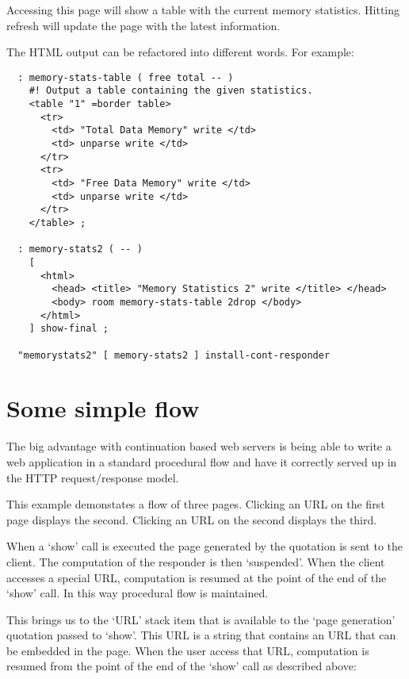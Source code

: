 Accessing this page will show a table with the current memory
statistics. Hitting refresh will update the page with the latest
information.

The HTML output can be refactored into different words. For example:

\begin{verbatim}
  : memory-stats-table ( free total -- )
    #! Output a table containing the given statistics.
    <table "1" =border table>
      <tr> 
        <td> "Total Data Memory" write </td>
        <td> unparse write </td>
      </tr>
      <tr> 
        <td> "Free Data Memory" write </td>
        <td> unparse write </td>
      </tr>
    </table> ;

  : memory-stats2 ( -- )
    [
      <html>
        <head> <title> "Memory Statistics 2" write </title> </head>
        <body> room memory-stats-table 2drop </body>
      </html>
    ] show-final ;

  "memorystats2" [ memory-stats2 ] install-cont-responder
\end{verbatim}

\section{Some simple flow}

The big advantage with continuation based web servers is being able to
write a web application in a standard procedural flow and have it
correctly served up in the HTTP request/response model.

This example demonstates a flow of three pages. Clicking an URL on the
first page displays the second. Clicking an URL on the second displays
the third.

When a `show' call is executed the page generated by the quotation is
sent to the client. The computation of the responder is then
`suspended'. When the client accesses a special URL, computation is
resumed at the point of the end of the `show' call. In this way
procedural flow is maintained.

This brings us to the `URL' stack item that is available to the `page
generation' quotation passed to `show'. This URL is a string that
contains an URL that can be embedded in the page. When the user access
that URL, computation is resumed from the point of the end of the
`show' call as described above:

